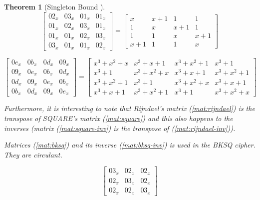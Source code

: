 \documentclass{report}
\newtheorem{theorem}{Theorem}{\bfseries}{\itshape}
\begin{document}
\begin{theorem}[Singleton Bound \cite{SloaneBook}]
\begin{equation}\label{mat:rijndael}
\begin{bmatrix}
02_x & 03_x & 01_x & 01_x\\
01_x & 02_x & 03_x & 01_x\\
01_x & 01_x & 02_x & 03_x\\
03_x & 01_x & 01_x & 02_x
\end{bmatrix}
=
\begin{bmatrix}
x & x+1 & 1 & 1\\
1 & x & x+1 & 1\\
1 & 1 & x & x+1\\
x+1 & 1 & 1 & x
\end{bmatrix}
\end{equation}

\begin{equation}\label{mat:rijndael-inv}
\begin{bmatrix}
0e_x & 0b_x & 0d_x & 09_x\\
09_x & 0e_x & 0b_x & 0d_x\\
0d_x & 09_x & 0e_x & 0b_x\\
0b_x & 0d_x & 09_x & 0e_x
\end{bmatrix}
=
\begin{bmatrix}
x^3+x^2+x & x^3+x+1 & x^3+x^2+1 & x^3+1\\
x^3+1 & x^3+x^2+x & x^3+x+1 & x^3+x^2+1\\
x^3+x^2+1 & x^3+1 & x^3+x^2+x & x^3+x+1\\
x^3+x+1 & x^3+x^2+1 & x^3+1 & x^3+x^2+x
\end{bmatrix}
\end{equation}

Furthermore, it is interesting to note that Rijndael's matrix (\ref{mat:rijndael}) is the transpose of SQUARE's matrix (\ref{mat:square}) and this also happens to the inverses (matrix (\ref{mat:square-inv}) is the transpose of (\ref{mat:rijndael-inv})).

Matrices (\ref{mat:bksq}) and its inverse (\ref{mat:bksq-inv}) is used in the BKSQ \cite{BKSQ1998} cipher. They are circulant.

\begin{equation}\label{mat:bksq}
\begin{bmatrix}
03_x & 02_x & 02_x\\
02_x & 03_x & 02_x\\
02_x & 02_x & 03_x
\end{bmatrix}
\end{equation}


\end{theorem}
\end{document}
